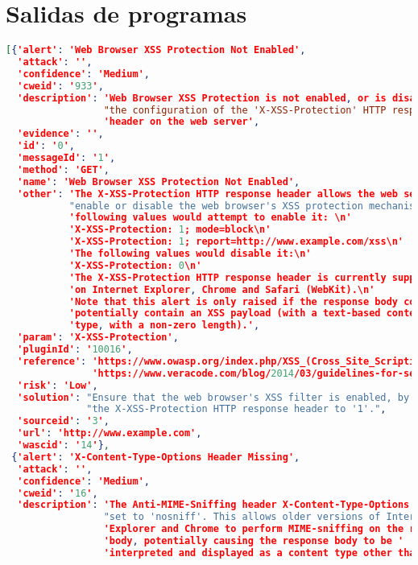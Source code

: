 \section{Salidas de programas}

\begin{lstlisting}[language=json,label={lst:owas_zap_welcome_message_alerts},caption={Alerts showed with NGINX default configuration}]
[{'alert': 'Web Browser XSS Protection Not Enabled',
  'attack': '',
  'confidence': 'Medium',
  'cweid': '933',
  'description': 'Web Browser XSS Protection is not enabled, or is disabled by '
                 "the configuration of the 'X-XSS-Protection' HTTP response "
                 'header on the web server',
  'evidence': '',
  'id': '0',
  'messageId': '1',
  'method': 'GET',
  'name': 'Web Browser XSS Protection Not Enabled',
  'other': 'The X-XSS-Protection HTTP response header allows the web server to '
           "enable or disable the web browser's XSS protection mechanism. The "
           'following values would attempt to enable it: \n'
           'X-XSS-Protection: 1; mode=block\n'
           'X-XSS-Protection: 1; report=http://www.example.com/xss\n'
           'The following values would disable it:\n'
           'X-XSS-Protection: 0\n'
           'The X-XSS-Protection HTTP response header is currently supported '
           'on Internet Explorer, Chrome and Safari (WebKit).\n'
           'Note that this alert is only raised if the response body could '
           'potentially contain an XSS payload (with a text-based content '
           'type, with a non-zero length).',
  'param': 'X-XSS-Protection',
  'pluginId': '10016',
  'reference': 'https://www.owasp.org/index.php/XSS_(Cross_Site_Scripting)_Prevention_Cheat_Sheet\n'
               'https://www.veracode.com/blog/2014/03/guidelines-for-setting-security-headers/',
  'risk': 'Low',
  'solution': "Ensure that the web browser's XSS filter is enabled, by setting "
              "the X-XSS-Protection HTTP response header to '1'.",
  'sourceid': '3',
  'url': 'http://www.example.com',
  'wascid': '14'},
 {'alert': 'X-Content-Type-Options Header Missing',
  'attack': '',
  'confidence': 'Medium',
  'cweid': '16',
  'description': 'The Anti-MIME-Sniffing header X-Content-Type-Options was not '
                 "set to 'nosniff'. This allows older versions of Internet "
                 'Explorer and Chrome to perform MIME-sniffing on the response '
                 'body, potentially causing the response body to be '
                 'interpreted and displayed as a content type other than the '

\end{lstlisting}
